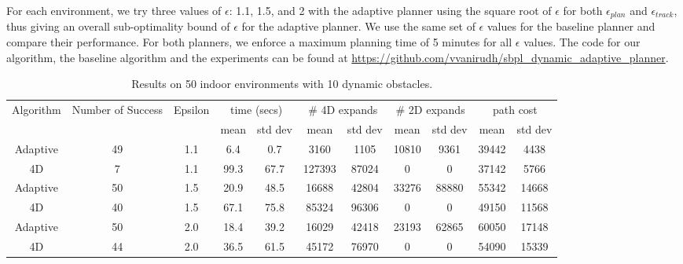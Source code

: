 For each environment, we try three values of $\epsilon$: 1.1, 1.5, and 2 with the adaptive planner using the square root of $\epsilon$ for both $\epsilon_{plan}$ and $\epsilon_{track}$, thus giving an overall sub-optimality bound of $\epsilon$ for the adaptive planner. We use the same set of $\epsilon$ values for the baseline planner and compare their performance. For both planners, we enforce a maximum planning time of 5 minutes for all $\epsilon$ values. 
The code for our algorithm, the baseline algorithm and the experiments can be found at \url{https://github.com/vvanirudh/sbpl_dynamic_adaptive_planner}.

\begin{table}[t]
\scriptsize
\centering

\begin{tabular}{|c|c|c|c c|c c|c c|c c|}
\hline
Algorithm & Number of Success & Epsilon & \multicolumn{2}{|c|}{time (secs)} & \multicolumn{2}{|c|}{\# 4D expands} & \multicolumn{2}{|c|}{\# 2D expands} & \multicolumn{2}{|c|}{path cost} \\ 
 & & & mean & std dev & mean & std dev & mean & std dev & mean  & std dev \\ \hline\hline
Adaptive & 49 & 1.1 & 6.4 & 0.7 & 3160 & 1105 & 10810 & 9361 & 39442 & 4438 \\
\hline
4D & 7 & 1.1 & 99.3 & 67.7 & 127393 & 87024 & 0 & 0 & 37142 & 5766 \\
\hline\hline
Adaptive & 50 & 1.5 & 20.9 & 48.5 & 16688 & 42804 & 33276 & 88880 & 55342 & 14668 \\
\hline
4D & 40 & 1.5 & 67.1 & 75.8 & 85324 & 96306 & 0 & 0 & 49150 & 11568 \\
\hline\hline
Adaptive & 50 & 2.0 & 18.4 & 39.2 & 16029 & 42418 & 23193 & 62865 & 60050 & 17148 \\
\hline
4D & 44 & 2.0 & 36.5 & 61.5 & 45172 & 76970 & 0 & 0 & 54090 & 15339 \\
\hline
\end{tabular}

\caption{Results on 50 indoor environments with 10 dynamic obstacles.}
\label{tab:indoor-10}
\end{table}



